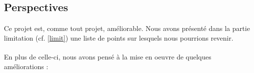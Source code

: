 \documentclass{scrartcl}
\begin{document}
\subsection{Perspectives}
    
    \paragraph{}Ce projet est, comme tout projet, améliorable. Nous avons présenté dans la partie limitation (cf. \ref{limit}) une liste de points sur lesquels nous pourrions revenir.
    
    \paragraph{}En plus de celle-ci, nous avons pensé à la mise en oeuvre de quelques améliorations :
\end{document}
